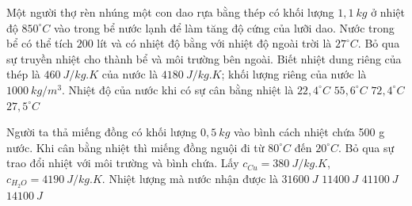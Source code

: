 \begin{ex}
	Một người thợ rèn nhúng một con dao rựa bằng thép có khối lượng $1,1 \ kg$ ở nhiệt độ $850^\circ C$ vào trong bể nước lạnh để làm tăng độ cứng của lưỡi dao. Nước trong bể có thể tích $200$ lít và có nhiệt độ bằng với nhiệt độ ngoài trời là $27^\circ C$. Bỏ qua sự truyền nhiệt cho thành bể và môi trường bên ngoài. Biết nhiệt dung riêng của thép là $460 \ J / kg. K$ của nước là $4180 \ J / kg. K$; khối lượng riêng của nước là $1000\ kg/m^3$. Nhiệt độ của nước khi có sự cân bằng nhiệt là
	\choice
	{$22,4^\circ C$}
	{$55,6^\circ C$}
	{$72,4^\circ C$}
	{\True $27,5^\circ C$}
	\end{ex}
%
\begin{ex}%
	Người ta thả miếng đồng có khối lượng $0,5\ kg$ vào bình cách nhiệt chứa 500 g nước. Khi cân bằng nhiệt thì miếng đồng nguội đi từ $80^\circ C$ đến $20^{\circ}C$. Bỏ qua sự trao đổi nhiệt với môi trường và bình chứa. Lấy $c_{Cu}=380\ J/kg.K$, $c_{H_2O}=4190\ J/kg.K$. Nhiệt lượng mà nước nhận được là
	\choice
	{$31600\ J$}
	{\True $11400\ J$}
	{$41100\ J$}
	{$14100\ J$}
	\end{ex}
